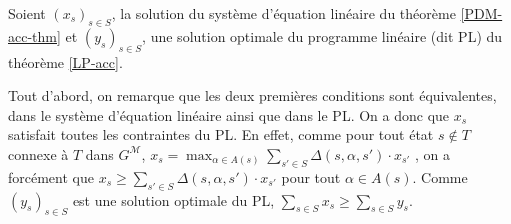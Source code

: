 \documentclass[12pt,a4paper]{report}
\theoremstyle{definition}%
\theoremstyle{remark}
\begin{document}
Soient $(x_s)_{s \in S}$, la solution du système d'équation linéaire du
théorème \ref{PDM-acc-thm} et $(y_s)_{s \in S}$, une solution optimale
 du programme linéaire (dit PL) du théorème \ref{LP-acc}. \par
Tout d'abord, on remarque que les deux premières conditions sont équivalentes, dans le
système d'équation linéaire ainsi que dans le PL.
On a donc que $x_s$ satisfait toutes les contraintes du PL. En effet,
comme pour tout état $s \not\in T$ connexe à $T$ dans $G^\mathcal{M}$, $x_s = \max_{\alpha \in A(s)} \sum_{s' \in S} \Delta(s, \alpha, s') \cdot x_{s'}$
, on a forcément que $x_s \geq \sum_{s' \in S} \Delta(s, \alpha, s') \cdot x_{s'}$ pour tout
$\alpha \in A(s)$.
Comme $(y_s)_{s \in S}$ est une solution optimale du PL,
$\sum_{s \in S} x_s \geq \sum_{s \in S} y_s$. \par
\end{document}
